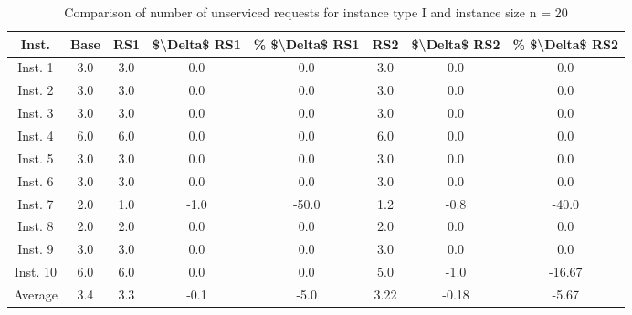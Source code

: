 \begin{table}[H]
\centering
\begin{tabular}{cccccccc}
  \hline
  \textbf{Inst.} & \textbf{Base} & \textbf{RS1} & \textbf{\$\textbackslash{}Delta\$  RS1} & \textbf{\% \$\textbackslash{}Delta\$  RS1} & \textbf{RS2} & \textbf{\$\textbackslash{}Delta\$  RS2} & \textbf{\% \$\textbackslash{}Delta\$  RS2} \\\hline
  Inst. 1 & 3.0 & 3.0 & 0.0 & 0.0 & 3.0 & 0.0 & 0.0 \\
  Inst. 2 & 3.0 & 3.0 & 0.0 & 0.0 & 3.0 & 0.0 & 0.0 \\
  Inst. 3 & 3.0 & 3.0 & 0.0 & 0.0 & 3.0 & 0.0 & 0.0 \\
  Inst. 4 & 6.0 & 6.0 & 0.0 & 0.0 & 6.0 & 0.0 & 0.0 \\
  Inst. 5 & 3.0 & 3.0 & 0.0 & 0.0 & 3.0 & 0.0 & 0.0 \\
  Inst. 6 & 3.0 & 3.0 & 0.0 & 0.0 & 3.0 & 0.0 & 0.0 \\
  Inst. 7 & 2.0 & 1.0 & -1.0 & -50.0 & 1.2 & -0.8 & -40.0 \\
  Inst. 8 & 2.0 & 2.0 & 0.0 & 0.0 & 2.0 & 0.0 & 0.0 \\
  Inst. 9 & 3.0 & 3.0 & 0.0 & 0.0 & 3.0 & 0.0 & 0.0 \\
  Inst. 10 & 6.0 & 6.0 & 0.0 & 0.0 & 5.0 & -1.0 & -16.67 \\
  Average & 3.4 & 3.3 & -0.1 & -5.0 & 3.22 & -0.18 & -5.67 \\\hline
\end{tabular}
\caption{Comparison of number of unserviced requests for instance type I and instance size n = 20}
\label{tab:wait:resrelocation-nTaxi-comparison_I_20}
\end{table}
